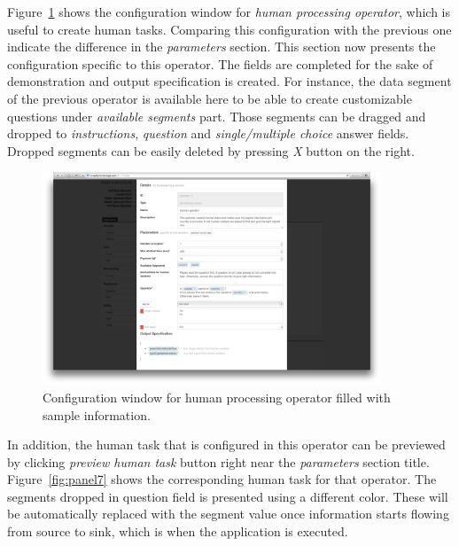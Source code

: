 Figure~\ref{fig:panel6} shows the configuration window for 
\textit{human processing operator}, which is useful to create human tasks. 
Comparing this configuration with the previous 
one indicate the difference in the \textit{parameters} section. This section now presents 
the configuration specific to this operator. The fields are completed for the sake of 
demonstration and output specification is created. For instance, the data segment of 
the previous operator is available here to be able to create customizable questions 
under \textit{available segments} part. Those segments can be dragged and dropped 
to \textit{instructions}, \textit{question} and \textit{single/multiple choice} answer fields. 
Dropped segments can be easily deleted by pressing \textit{X} button on the right.

\begin{figure}[ht]
	\centering
	\includegraphics[width=0.9\textwidth]{figures/tool/panel6.png}
	\caption{Configuration window for human processing operator filled with sample information.}
	\label{fig:panel6}
\end{figure}

In addition, the human task that is configured in this operator can be previewed 
by clicking \textit{preview human task} button right near the \textit{parameters} 
section title. Figure~\ref{fig:panel7} shows the corresponding human task for 
that operator. The segments dropped in question field is presented using a different 
color. These will be automatically replaced with the segment value once 
information starts flowing from source to sink, which is when the application 
is executed.

